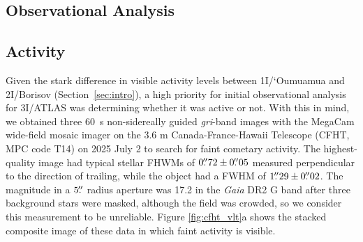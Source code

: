 \documentclass[twocolumn,longbib]{aastex7}
\begin{document}
\begin{CJK*}{UTF8}{gbsn}
\section{Observational Analysis}\label{sec:observations}

\subsection{Activity}\label{sec:activity}

Given the stark difference in visible activity levels between 1I/`Oumuamua and 2I/Borisov (Section~\ref{sec:intro}), a high priority for initial observational analysis for 3I/ATLAS was determining whether it was active or not.
With this in mind, we obtained three 60~s non-sidereally guided \textit{gri}-band images with the MegaCam wide-field mosaic imager \citep{boulade2003_megacam} on the 3.6 m Canada-France-Hawaii Telescope (CFHT, MPC code T14) on 2025 July 2 to search for faint cometary activity. The highest-quality image had typical stellar FHWMs of $0\mbox{$.\!\!^{\prime\prime}$}72\pm0\mbox{$.\!\!^{\prime\prime}$}05$ measured perpendicular to the direction of trailing, while the object had a FWHM of $1\mbox{$.\!\!^{\prime\prime}$}29 \pm 0\mbox{$.\!\!^{\prime\prime}$}02$. The magnitude in a $5\mbox{$.\!\!^{\prime\prime}$}$ radius aperture was 17.2 in the \textit{Gaia} DR2 G band
after three background stars were masked, although the field was crowded, so we consider this measurement to be unreliable.
Figure \ref{fig:cfht_vlt}a shows the stacked composite image of these data in which faint activity is visible.




\end{CJK*}
\end{document}
